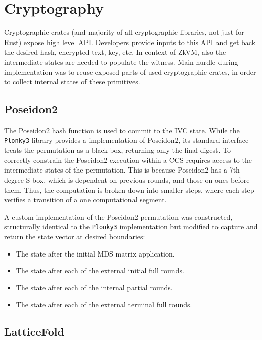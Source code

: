 \section{Cryptography}

Cryptographic crates (and majority of all cryptographic libraries, not just for Rust)
expose high level API. Developers provide inputs to this API and get back the
desired hash, encrypted text, key, etc. In context of ZkVM, also the intermediate
states are needed to populate the witness. Main hurdle during implementation
was to reuse exposed parts of used cryptographic crates, in order to collect
internal states of these primitives.

\subsection{Poseidon2}

The Poseidon2 hash function is used to commit to the IVC state. While the
\texttt{Plonky3} library provides a implementation of Poseidon2, its standard
interface treats the permutation as a black box, returning only the final digest.
To correctly constrain the Poseidon2 execution within a CCS requires access to
the intermediate states of the permutation. This is because Poseidon2 has
a 7th degree S-box, which is dependent on previous rounds, and those on ones
before them. Thus, the computation is broken down into smaller
steps, where each step verifies a transition of a one computational segment.

A custom implementation of the Poseidon2 permutation was
constructed, structurally identical to the \texttt{Plonky3} implementation but
modified to capture and return the state vector at desired boundaries:

\begin{itemize}
	\item The state after the initial MDS matrix application.
	\item The state after each of the external initial full rounds.
	\item The state after each of the internal partial rounds.
	\item The state after each of the external terminal full rounds.
\end{itemize}

\subsection{LatticeFold}\label{subsec:latticefold}

